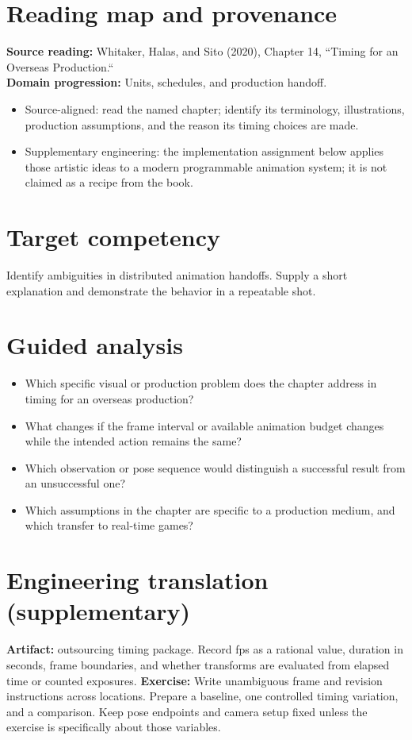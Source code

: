 \documentclass[10pt,letterpaper]{article}
\begin{document}
\makedoctitle
\makedocsummary

\section{Reading map and provenance}
\textbf{Source reading:} Whitaker, Halas, and Sito (2020), Chapter 14, ``Timing for an Overseas Production.``\\
\textbf{Domain progression:} Units, schedules, and production handoff.
\begin{itemize}
\item Source-aligned: read the named chapter; identify its terminology, illustrations, production assumptions, and the reason its timing choices are made.
\item Supplementary engineering: the implementation assignment below applies those artistic ideas to a modern programmable animation system; it is not claimed as a recipe from the book.
\end{itemize}
\section{Target competency}
Identify ambiguities in distributed animation handoffs. Supply a short explanation and demonstrate the behavior in a repeatable shot.
\section{Guided analysis}
\begin{itemize}
\item Which specific visual or production problem does the chapter address in timing for an overseas production?
\item What changes if the frame interval or available animation budget changes while the intended action remains the same?
\item Which observation or pose sequence would distinguish a successful result from an unsuccessful one?
\item Which assumptions in the chapter are specific to a production medium, and which transfer to real-time games?
\end{itemize}
\section{Engineering translation (supplementary)}
\textbf{Artifact:} outsourcing timing package. Record fps as a rational value, duration in seconds, frame boundaries, and whether transforms are evaluated from elapsed time or counted exposures.
\textbf{Exercise:} Write unambiguous frame and revision instructions across locations. Prepare a baseline, one controlled timing variation, and a comparison. Keep pose endpoints and camera setup fixed unless the exercise is specifically about those variables.
\end{document}
